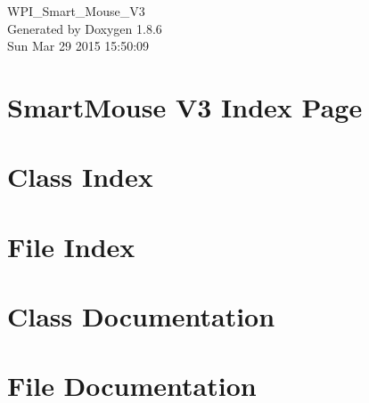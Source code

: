 \documentclass[twoside]{book}
\newcommand{\clearemptydoublepage}{%
  \newpage{\pagestyle{empty}\cleardoublepage}%
}
\begin{document}
\begin{titlepage}
\vspace*{7cm}
\begin{center}%
{\Large W\-P\-I\-\_\-\-Smart\-\_\-\-Mouse\-\_\-\-V3 }\\
\vspace*{1cm}
{\large Generated by Doxygen 1.8.6}\\
\vspace*{0.5cm}
{\small Sun Mar 29 2015 15:50:09}\\
\end{center}
\end{titlepage}
\clearemptydoublepage
\tableofcontents
\clearemptydoublepage
{}

\chapter{Smart\-Mouse V3 Index Page}
\label{index}
\chapter{Class Index}

\chapter{File Index}

\chapter{Class Documentation}



\chapter{File Documentation}











\newpage
{}
{}
\printindex
\end{document}
